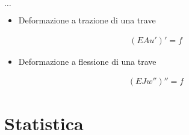 \documentclass[letterpaper,10pt,english]{jupyterBook}
\begin{document}
\sphinxAtStartPar
\(\dots\)
\begin{itemize}
\item {} 
\sphinxAtStartPar
Deformazione a trazione di una trave

\end{itemize}
\begin{equation*}
\begin{split}(EA u')' = f\end{split}
\end{equation*}\begin{itemize}
\item {} 
\sphinxAtStartPar
Deformazione a flessione di una trave

\end{itemize}
\begin{equation*}
\begin{split}(EJ w'')'' = f\end{split}
\end{equation*}
\sphinxstepscope


\part{Statistica}

\sphinxstepscope
\end{document}
